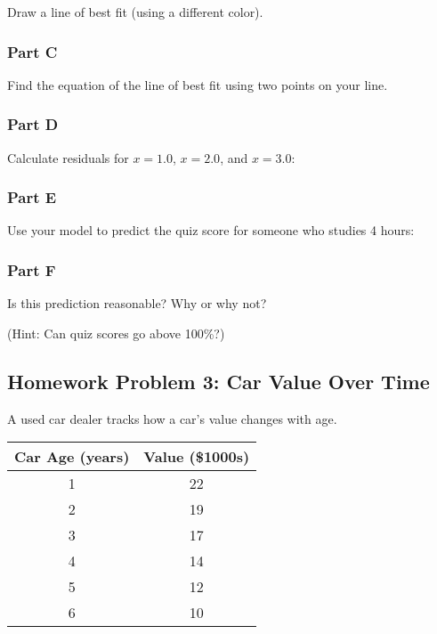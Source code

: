 \documentclass[12pt]{article}
\begin{document}
				Draw a line of best fit (using a different color).

				\newpage

			\subsubsection*{Part C}

				Find the equation of the line of best fit using two points on your line.

				\vspace{5cm}

			\subsubsection*{Part D}
				
				Calculate residuals for $x = 1.0$, $x = 2.0$, and $x = 3.0$:

				\vspace{5cm}

			\subsubsection*{Part E}
				
				Use your model to predict the quiz score for someone who studies 4 hours:

				\vspace{2cm}

			\subsubsection*{Part F}
			
				Is this prediction reasonable? Why or why not?

				(Hint: Can quiz scores go above 100\%?)

				\vspace{2cm}

				\newpage

		\subsection*{Homework Problem 3: Car Value Over Time}

			A used car dealer tracks how a car's value changes with age.

			\begin{center}
				\begin{tabular}{|c|c|}
					\hline
					Car Age (years) & Value (\$1000s) \\
					\hline
					1 & 22 \\
					2 & 19 \\
					3 & 17 \\
					4 & 14 \\
					5 & 12 \\
					6 & 10 \\
					\hline
				\end{tabular}
			\end{center}
\end{document}
